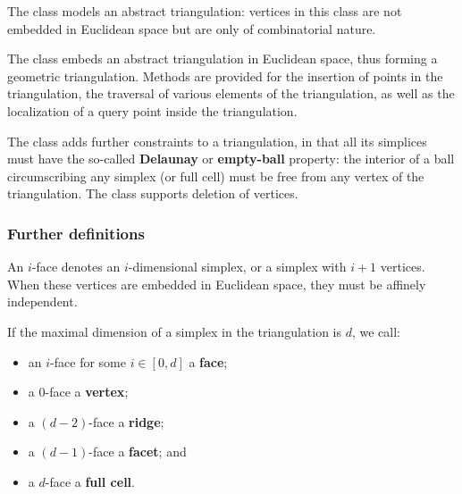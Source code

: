 The class  models an abstract triangulation: vertices in this
class are not embedded in Euclidean space but are only of combinatorial
nature.

The class  embeds an abstract
triangulation in Euclidean space, thus forming a geometric
triangulation. Methods are
provided for the insertion %
of points in the triangulation, the
traversal of various elements of the triangulation, as well as the localization of a
query point inside the triangulation.

The class  adds further
constraints to a triangulation, in that all its simplices must have the
so-called \textbf{Delaunay} or \textbf{empty-ball} property: the interior of
a ball circumscribing any simplex (or full cell) must be free from any
vertex of the triangulation. The  class
supports deletion of vertices.




\subsubsection{Further definitions}

An $i$-face denotes an $i$-dimensional simplex, or a simplex with $i+1$
vertices. When these vertices are embedded in Euclidean space, they must be
affinely independent.

If the maximal dimension of a simplex in the triangulation is
$d$, we call:\begin{itemize}
\item an $i$-face for some $i\in[0,d]$ a  \textbf{face};
\item a $0$-face a \textbf{vertex};
\item a $(d-2)$-face a \textbf{ridge};
\item a $(d-1)$-face a \textbf{facet}; and
\item a $d$-face  a \textbf{full cell}.
\end{itemize}

